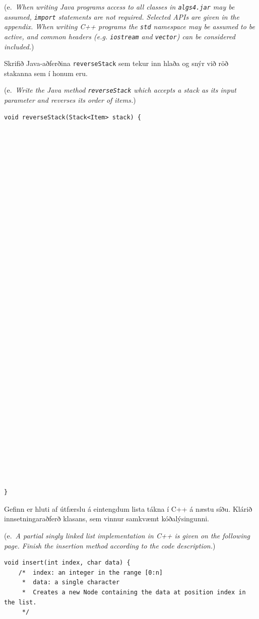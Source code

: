 \documentclass[addpoints]{exam}
\newcommand{\eng}[1]{(e.\ \emph{#1})}
\begin{document}
\begin{questions}
	\eng{When writing Java programs access to all classes in \texttt{algs4.jar} may be assumed, \texttt{import} statements are not required. Selected APIs are given in the appendix. When writing C++ programs the \texttt{std} namespace may be assumed to be active, and common headers (e.g. \texttt{iostream} and \texttt{vector}) can be considered included.}

	\question[4] Skrifið Java-aðferðina \texttt{reverseStack} sem tekur inn hlaða og snýr við röð stakanna sem í honum eru.

	\eng{Write the Java method \texttt{reverseStack} which accepts a stack as its input parameter and reverses its order of items.}

	\begin{verbatim}
void reverseStack(Stack<Item> stack) {





































}
\end{verbatim}


	\question[4] Gefinn er hluti af útfærslu á eintengdum lista tákna í C++ á næstu síðu. Klárið innsetningaraðferð klasans, sem vinnur samkvæmt kóðalýsingunni.

	\eng{A partial singly linked list implementation in C++ is given on the following page. Finish the insertion method according to the code description.}
	\begin{verbatim}
void insert(int index, char data) {
	/*  index: an integer in the range [0:n]
	 *  data: a single character
	 *  Creates a new Node containing the data at position index in the list.
	 */
	 
	 
	 
	 
	 
	 
	 
	 
	 
	 
	 

\end{verbatim}
\end{questions}
\end{document}

